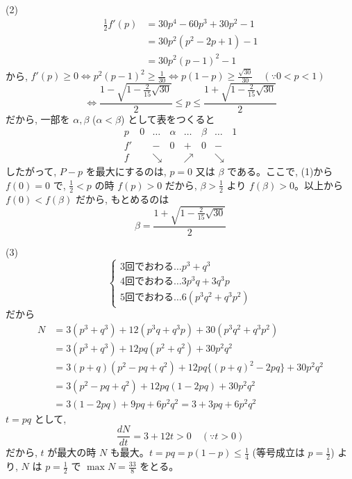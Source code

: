 \documentclass[../main.tex]{subfiles}
\begin{document}
(2)
\[
  \begin{aligned}
    \frac{1}{2} f'(p) &= 30p^4 - 60p^3 + 30p^2 - 1 \\
    &= 30p^2(p^2 - 2p + 1) - 1 \\
    &= 30p^2(p-1)^2 - 1
  \end{aligned}
\]
から, $f'(p) \ge 0 \iff p^2(p-1)^2 \ge \frac{1}{30} \iff p(1-p) \ge \frac{\sqrt{30}}{30} \quad (\because 0 < p < 1)$
\[
  \iff \frac{1 - \sqrt{1 - \frac{2}{15}\sqrt{30}}}{2} \le p \le \frac{1 + \sqrt{1 - \frac{2}{15}\sqrt{30}}}{2}
\]
だから, 一部を $\alpha, \beta$ ($\alpha < \beta$) として表をつくると
\[
  \begin{array}{c|c|c|c|c|c|c|c}
    p & 0 & \dots & \alpha & \dots & \beta & \dots & 1 \\
    \hline
    f' & & - & 0 & + & 0 & - & \\
    \hline
    f & & \searrow & & \nearrow & & \searrow &
  \end{array}
\]
したがって, $P-p$ を最大にするのは, $p = 0$ 又は $\beta$ である。ここで, (1)から $f(0) = 0$ で, $\frac{1}{2} < p$ の時 $f(p) > 0$ だから, $\beta > \frac{1}{2}$ より $f(\beta) > 0$。以上から $f(0) < f(\beta)$ だから,
もとめるのは
\[
  \beta = \frac{1 + \sqrt{1 - \frac{2}{15}\sqrt{30}}}{2}
\]

(3)
\[
  \begin{cases}
    3 \text{回でおわる} \dots p^3 + q^3 \\
    4 \text{回でおわる} \dots 3p^3 q + 3q^3 p \\
    5 \text{回でおわる} \dots 6(p^3 q^2 + q^3 p^2)
  \end{cases}
\]
だから
\[
  \begin{aligned}
    N &= 3(p^3 + q^3) + 12(p^3 q + q^3 p) + 30(p^3 q^2 + q^3 p^2) \\
    &= 3(p^3 + q^3) + 12pq(p^2 + q^2) + 30p^2 q^2 \\
    &= 3(p+q)(p^2 - pq + q^2) + 12pq \{ (p+q)^2 - 2pq \} + 30p^2 q^2 \\
    &= 3(p^2 - pq + q^2) + 12pq(1 - 2pq) + 30p^2 q^2 \\
    &= 3(1 - 2pq) + 9pq + 6p^2 q^2 = 3 + 3pq + 6p^2 q^2
  \end{aligned}
\]
$t = pq$ として,
\[
  \frac{dN}{dt} = 3 + 12t > 0 \quad (\because t > 0)
\]
だから, $t$ が最大の時 $N$ も最大。$t = pq = p(1-p) \le \frac{1}{4}$ (等号成立は $p = \frac{1}{2}$)
より, $N$ は $p = \frac{1}{2}$ で $\max N = \frac{33}{8}$ をとる。
\end{document}
